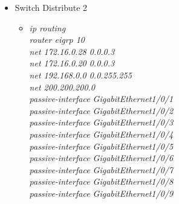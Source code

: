 \documentclass[a4paper, 12pt]{article}
\begin{document}
\begin{itemize}
\begin{itemize}
\begin{itemize}
          \end{itemize}
             \item Switch Distribute 2
        \begin{itemize}
         \item \textit{ip routing\\
            router eigrp 10\\
           net 172.16.0.28 0.0.0.3 \\
            net 172.16.0.20 0.0.0.3\\
            net 192.168.0.0 0.0.255.255\\
            net 200.200.200.0 \\
            passive-interface GigabitEthernet1/0/1\\
            passive-interface GigabitEthernet1/0/2\\
            passive-interface GigabitEthernet1/0/3\\
            passive-interface GigabitEthernet1/0/4\\
            passive-interface GigabitEthernet1/0/5\\
            passive-interface GigabitEthernet1/0/6\\
            passive-interface GigabitEthernet1/0/7\\
            passive-interface GigabitEthernet1/0/8\\
            passive-interface GigabitEthernet1/0/9\\}
         
          \end{itemize}
       \end{itemize}
     

\end{itemize}
\end{document}
